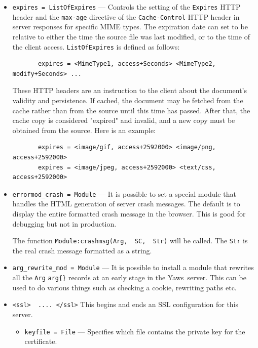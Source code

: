 \documentclass[11pt,oneside,english]{book}
\newcommand{\Yaws}            %
        {{\sc Yaws}}
\begin{document}
\begin{itemize}
\item       \verb+expires = ListOfExpires+ ---
              Controls the setting of the \verb+Expires+ HTTP header and the
              \verb+max-age+ directive of the \verb+Cache-Control+ HTTP header
              in server responses for specific MIME types. The expiration date
              can set to be relative to either the time the source file was last
              modified, or to the time of the client
              access. \verb+ListOfExpires+ is defined as follows:
\begin{verbatim}
       expires = <MimeType1, access+Seconds> <MimeType2, modify+Seconds> ...
\end{verbatim}
              These HTTP headers are an instruction to the client about the
              document's validity and persistence. If cached, the document may
              be fetched from the cache rather than from the source until this
              time has passed. After that, the cache copy is considered
              "expired" and invalid, and a new copy must be obtained from the
              source.
              Here is an example:
\begin{verbatim}
       expires = <image/gif, access+2592000> <image/png, access+2592000>
       expires = <image/jpeg, access+2592000> <text/css, access+2592000>
\end{verbatim}

\item       \verb+errormod_crash = Module+ ---
              It  is possible to set a special module that
              handles the HTML generation of server  crash
              messages.  The  default  is  to  display the
              entire  formatted  crash   message   in   the
              browser.  This is good for debugging but not
              in production.

              The function \verb+Module:crashmsg(Arg,  SC,  Str)+
              will  be  called.  The \verb+Str+ is the real crash
              message formatted as a string.

\item       \verb+arg_rewrite_mod = Module+ ---
              It is possible  to  install  a  module  that
              rewrites  all  the  \verb+Arg+ \verb+arg{}+ records at an
              early stage in the \Yaws\  server.  This can be
              used to do various things such as checking a
              cookie, rewriting paths etc.

\item        \verb+<ssl>  .... </ssl>+
              This begins and ends  an  SSL  configuration
              for this server.
\begin{itemize}
\item        \verb+keyfile = File+ ---
              Specifies  which  file  contains the private
              key for the certificate.


\end{itemize}
\end{itemize}
\end{document}
